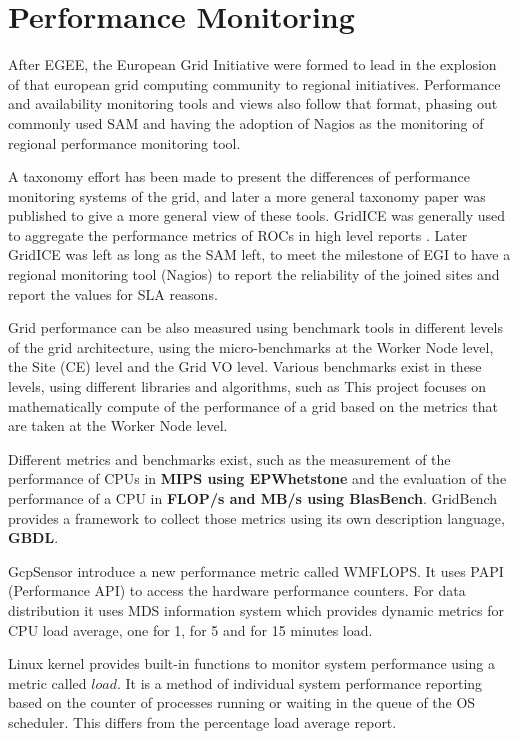 \section{Performance Monitoring}
After EGEE, the European Grid Initiative were formed to lead in the explosion of that european grid computing community to regional initiatives. Performance and availability monitoring tools and views also follow that format, phasing out commonly used SAM \cite{egee3dsa122} and having the adoption of Nagios as the monitoring of regional performance monitoring tool.

A taxonomy effort has been made \cite{gerndt2004performance} to present the differences of performance monitoring systems of the grid, and later a more general \cite{zanikolas2007importance} taxonomy paper was published to give a more general view of these tools. GridICE was generally used to aggregate the performance metrics of ROCs in high level reports \cite{andreozzi2005gridice}. Later GridICE was left as long as the SAM left, to meet the milestone of EGI to have a regional monitoring tool (Nagios) to report the reliability of the joined sites and report the values for SLA reasons.

Grid performance can be also measured using benchmark tools in different levels of the grid architecture, using the micro-benchmarks at the Worker Node level, the Site (CE) level and the Grid VO level. Various benchmarks exist in these levels, using different libraries and algorithms, such as This project focuses on mathematically compute of the performance of a grid based on the metrics that are taken at the Worker Node level.

Different metrics and benchmarks exist, such as the measurement of the performance of CPUs in {\bf MIPS using EPWhetstone} and the evaluation of the performance of a CPU in {\bf FLOP/s and MB/s using BlasBench}. GridBench \cite{gridbench} provides a framework to collect those metrics using its own description language, {\bf GBDL}.

GcpSensor \cite{gcpsensor} introduce a new performance metric called WMFLOPS. It uses PAPI \cite{papi} (Performance API) to access the hardware performance counters. For data distribution it uses MDS information system which provides dynamic metrics for CPU load average, one for 1, for 5 and for 15 minutes load.

Linux kernel provides built-in functions to monitor system performance using a metric called $load$. It is a method of individual system performance reporting based on the counter of processes running or waiting in the queue of the OS scheduler. This differs from the percentage load average report.

